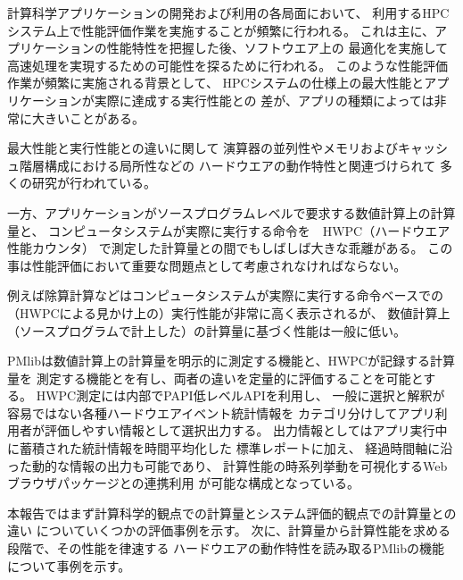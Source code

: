 \documentclass[submit,techrep,noauthor]{ipsj}
\begin{document}
計算科学アプリケーションの開発および利用の各局面において、
利用するHPCシステム上で性能評価作業を実施することが頻繁に行われる。
これは主に、アプリケーションの性能特性を把握した後、ソフトウエア上の
最適化を実施して高速処理を実現するための可能性を探るために行われる。
このような性能評価作業が頻繁に実施される背景として、
HPCシステムの仕様上の最大性能とアプリケーションが実際に達成する実行性能との
差が、アプリの種類によっては非常に大きいことがある。

最大性能と実行性能との違いに関して
演算器の並列性やメモリおよびキャッシュ階層構成における局所性などの
ハードウエアの動作特性と関連づけられて
多くの研究が行われている。

一方、アプリケーションがソースプログラムレベルで要求する数値計算上の計算量と、
コンピュータシステムが実際に実行する命令を　HWPC（ハードウエア性能カウンタ）
で測定した計算量との間でもしばしば大きな乖離がある。
この事は性能評価において重要な問題点として考慮されなければならない。

{ \color{blue}
例えば除算計算などはコンピュータシステムが実際に実行する命令ベースでの
（HWPCによる見かけ上の）実行性能が非常に高く表示されるが、
数値計算上（ソースプログラムで計上した）の計算量に基づく性能は一般に低い。
}

PMlibは数値計算上の計算量を明示的に測定する機能と、HWPCが記録する計算量を
測定する機能とを有し、両者の違いを定量的に評価することを可能とする。
HWPC測定には内部でPAPI低レベルAPIを利用し、
一般に選択と解釈が容易ではない各種ハードウエアイベント統計情報を
カテゴリ分けしてアプリ利用者が評価しやすい情報として選択出力する。
出力情報としてはアプリ実行中に蓄積された統計情報を時間平均化した
標準レポートに加え、
経過時間軸に沿った動的な情報の出力も可能であり、
計算性能の時系列挙動を可視化するWebブラウザパッケージとの連携利用
が可能な構成となっている。

本報告ではまず計算科学的観点での計算量とシステム評価的観点での計算量との違い
についていくつかの評価事例を示す。
次に、計算量から計算性能を求める段階で、その性能を律速する
ハードウエアの動作特性を読み取るPMlibの機能について事例を示す。
\end{document}
